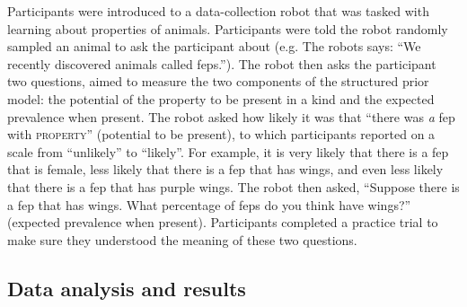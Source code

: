 \documentclass[12pt,letterpaper]{article}
\begin{document}
Participants were introduced to a data-collection robot that was tasked with learning about properties of animals. 
Participants were told the robot randomly sampled an animal to ask the participant about (e.g. The robots says: ``We recently discovered animals called feps.''). 
The robot then asks the participant two questions, aimed to measure the two components of the structured prior model: the potential of the property to be present in a kind and the expected prevalence when present.
The robot asked how likely it was that ``there was \emph{a} fep with \textsc{property}'' (potential to be present), to which participants reported on a scale from ``unlikely'' to ``likely''.
For example, it is very likely that there is a fep that is female, less likely that there is a fep that has wings, and even less likely that there is a fep that has purple wings. 
The robot then asked, ``Suppose there is a fep that has wings. What percentage of feps do you think have wings?'' (expected prevalence when present). 
Participants completed a practice trial to make sure they understood the meaning of these two questions.

%

\subsection*{Data analysis and results}
\end{document}
